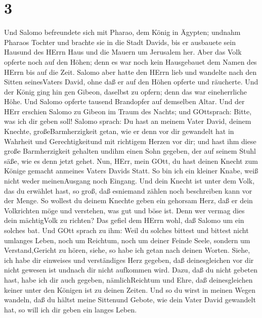 \hypertarget{section-2}{%
\section{3}\label{section-2}}

 Und Salomo befreundete sich mit Pharao, dem König in
Ägypten; undnahm Pharaos Tochter und brachte sie in die Stadt Davids,
bis er ausbauete sein Hausund des HErrn Haus und die Mauern um Jerusalem
her.  Aber das Volk opferte noch auf den Höhen; denn es war
noch kein Hausgebauet dem Namen des HErrn bis auf die Zeit. 
Salomo aber hatte den HErrn lieb und wandelte nach den Sitten
seinesVaters David, ohne daß er auf den Höhen opferte und räucherte.
 Und der König ging hin gen Gibeon, daselbst zu opfern; denn
das war eineherrliche Höhe. Und Salomo opferte tausend Brandopfer auf
demselben Altar.  Und der HErr erschien Salomo zu Gibeon im
Traum des Nachts; und GOttsprach: Bitte, was ich dir geben soll!
 Salomo sprach: Du hast an meinem Vater David, deinem
Knechte, großeBarmherzigkeit getan, wie er denn vor dir gewandelt hat in
Wahrheit und Gerechtigkeitund mit richtigem Herzen vor dir; und hast ihm
diese große Barmherzigkeit gehalten undihm einen Sohn gegeben, der auf
seinem Stuhl säße, wie es denn jetzt gehet.  Nun, HErr, mein
GOtt, du hast deinen Knecht zum Könige gemacht anmeines Vaters Davids
Statt. So bin ich ein kleiner Knabe, weiß nicht weder meinenAusgang noch
Eingang.  Und dein Knecht ist unter dem Volk, das du
erwählet hast, so groß, daß esniemand zählen noch beschreiben kann vor
der Menge.  So wollest du deinem Knechte geben ein gehorsam
Herz, daß er dein Volkrichten möge und verstehen, was gut und böse ist.
Denn wer vermag dies dein mächtigVolk zu richten?  Das
gefiel dem HErrn wohl, daß Salomo um ein solches bat.  Und
GOtt sprach zu ihm: Weil du solches bittest und bittest nicht umlanges
Leben, noch um Reichtum, noch um deiner Feinde Seele, sondern um
Verstand,Gericht zu hören,  siehe, so habe ich getan nach
deinen Worten. Siehe, ich habe dir einweises und verständiges Herz
gegeben, daß deinesgleichen vor dir nicht gewesen ist undnach dir nicht
aufkommen wird.  Dazu, daß du nicht gebeten hast, habe ich
dir auch gegeben, nämlichReichtum und Ehre, daß deinesgleichen keiner
unter den Königen ist zu deinen Zeiten.  Und so du wirst in
meinen Wegen wandeln, daß du hältst meine Sittenund Gebote, wie dein
Vater David gewandelt hat, so will ich dir geben ein langes Leben.
